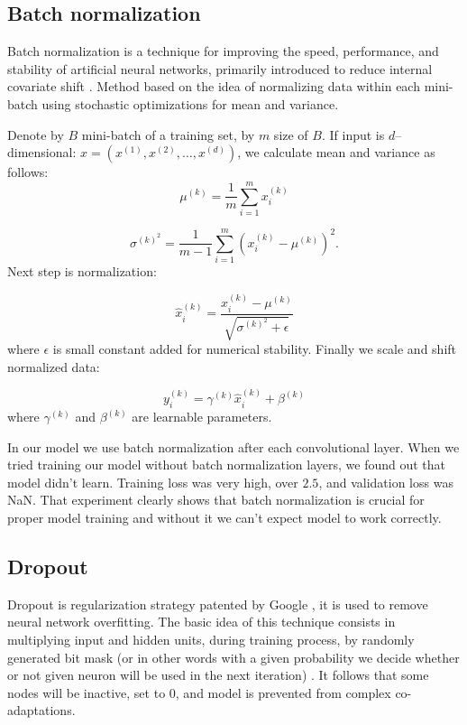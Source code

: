 \documentclass[licencjacka,en]{pracamgr}
\begin{document}
	\subsection{Batch normalization}
	Batch normalization is a technique for improving the speed, performance, and stability of artificial neural networks, primarily introduced to reduce internal covariate shift \cite{BN}. Method based on the idea of normalizing data within each mini-batch using stochastic optimizations for mean and variance.
	
	Denote by $B$ mini-batch of a training set, by $m$ size of $B$. If input is $d$--dimensional: $x = (x^{(1)}, x^{(2)}, \ldots, x^{(d)})$, we calculate mean and variance as follows:
	$$\mu^{(k)} = \frac{1}{m}\sum_{i=1}^m x^{(k)}_i$$
	
	$$ \sigma^{{(k)}^2} = \frac{1}{m-1} \sum_{i = 1}^{m} \left(x^{(k)}_i - \mu^{(k)}\right) ^ 2.$$
	Next step is normalization:
	
	$$
	\hat{x} ^ {(k)} _ i = \frac{x^{(k)}_i - \mu^{(k)}} {\sqrt{ \sigma^{{(k)}^2} + \epsilon}}
	$$
	where $\epsilon$ is small constant added for numerical stability. Finally we scale and shift normalized data:
	
	$$ y^{(k)}_i = \gamma^{(k)} \hat{x}^{(k)}_i + \beta^{(k)}$$
	where $\gamma^{(k)}$ and $\beta^{(k)}$ are learnable parameters.
	
	In our model we use batch normalization after each convolutional layer. When we tried training our model without batch normalization layers, we found out that model didn't learn. Training loss was very high, over $2.5$, and validation loss was NaN. That experiment clearly shows that batch normalization is crucial for proper model training and without it we can't expect model to work correctly.
	
	\subsection{Dropout}
	Dropout is regularization strategy patented by Google \cite{DROPG}, it is used to remove neural network overfitting. The basic idea of this technique consists in multiplying input and hidden units, during training process, by randomly generated bit mask (or in other words with a given probability we decide whether or not given neuron will be used in the next iteration) \cite{DROPW}. It follows that some nodes will be inactive, set to 0, and model is prevented from complex co-adaptations.
	
\end{document}
